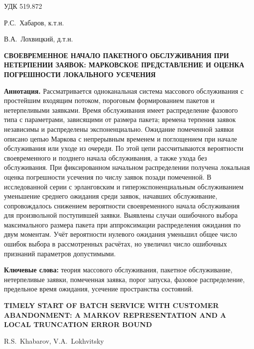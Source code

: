 \noindent УДК 519.872

\bigskip
\noindent Р.С.~Хабаров, к.т.н.\par
\noindent В.А.~Лохвицкий, д.т.н.

\begin{center}
{\large\bfseries СВОЕВРЕМЕННОЕ НАЧАЛО ПАКЕТНОГО ОБСЛУЖИВАНИЯ ПРИ НЕТЕРПЕНИИ ЗАЯВОК: МАРКОВСКОЕ ПРЕДСТАВЛЕНИЕ И ОЦЕНКА ПОГРЕШНОСТИ ЛОКАЛЬНОГО УСЕЧЕНИЯ}
\end{center}

\noindent\textbf{Аннотация.}
Рассматривается одноканальная система массового обслуживания с простейшим входящим потоком, пороговым формированием пакетов и нетерпеливыми заявками. Время обслуживания имеет распределение фазового типа с параметрами, зависящими от размера пакета; времена терпения заявок независимы и распределены экспоненциально. Ожидание помеченной заявки описано цепью Маркова с непрерывным временем и поглощением при начале обслуживания или уходе из очереди. По этой цепи рассчитываются вероятности своевременного и позднего начала обслуживания, а также ухода без обслуживания. При фиксированном начальном распределении получена локальная оценка погрешности усечения по числу заявок позади помеченной. В исследованной серии с эрланговским и гиперэкспоненциальным обслуживанием уменьшение среднего ожидания среди заявок, начавших обслуживание, сопровождалось снижением вероятности своевременного начала обслуживания для произвольной поступившей заявки. Выявлены случаи ошибочного выбора максимального размера пакета при аппроксимации распределения ожидания по двум моментам. Учёт вероятности нулевого ожидания уменьшил общее число ошибок выбора в рассмотренных расчётах, но увеличил число ошибочных признаний параметров допустимыми.

\medskip
\noindent\textbf{Ключевые слова:} теория массового обслуживания, пакетное обслуживание, нетерпеливые заявки, помеченная заявка, порог запуска, фазовое распределение, предельное время ожидания, усечение пространства состояний.

\begin{center}
\textbf{TIMELY START OF BATCH SERVICE WITH CUSTOMER ABANDONMENT: A MARKOV REPRESENTATION AND A LOCAL TRUNCATION ERROR BOUND}

R.S.~Khabarov, V.A.~Lokhvitsky
\end{center}

